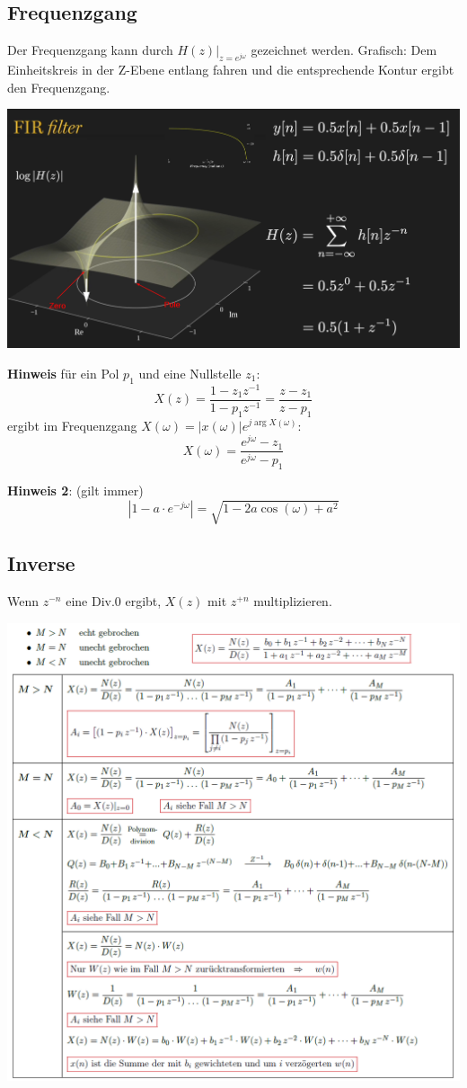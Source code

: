 \subsection{Frequenzgang}
Der Frequenzgang kann durch $\left.H(z)\right|_{z = e^{j\omega}}$ gezeichnet werden. Grafisch: Dem Einheitskreis in der Z-Ebene entlang fahren und die entsprechende Kontur ergibt den Frequenzgang.
\begin{center}
	\includegraphics[width=\columnwidth]{Images/fir_example}
\end{center}


\textbf{Hinweis} für ein Pol $p_1$ und eine Nullstelle $z_1$:
\[
X(z)= \frac{1-z_1z^{-1}}{1-p_1z^{-1}} = \frac{z - z_1}{z - p_1}
\]
ergibt im Frequenzgang $X(\omega) = \left|x(\omega)\right|e^{j\arg X(\omega)}$:
\[
X(\omega) = \frac{e^{j\omega} - z_1}{e^{j\omega} - p_1}
\]

\textbf{Hinweis 2}: (gilt immer)
\[
\left|1 - a\cdot e^{-j\omega}\right| = \sqrt{1- 2a \cos(\omega) + a^2}
\]
\subsection{Inverse}
Wenn $z^{-n}$ eine Div.0 ergibt, $X(z)$ mit $z^{+n}$ multiplizieren.
\begin{center}
	\includegraphics[width=\columnwidth]{Images/iztrans}
\end{center}

